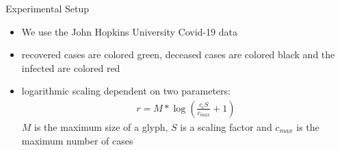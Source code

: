 \documentclass{beamer}
\begin{document}
  \begin{frame}{Experimental Setup}
	\begin{itemize}
		\item We use the John Hopkins University Covid-19 data
		\item recovered cases are colored green, deceased cases are colored black and 		the infected are colored red
		\item logarithmic scaling dependent on two parameters:
		\begin{align*}
			r=M* \log \left( \frac{c_i S}{c_{max}} +1 \right)
		\end{align*}
		$M$ is the maximum size of a glyph, $S$ is a scaling factor and $c_{max}$ is 			the maximum number of cases
	\end{itemize}
\end{frame}
  
  
  
\end{document}
